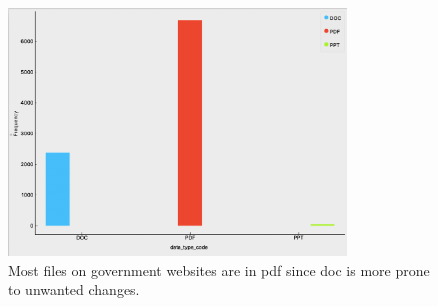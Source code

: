 \documentclass[runningheads]{llncs}
\begin{document}
\begin{figure}[H]
\centering
  \includegraphics[width=0.8\textwidth]{PDF_distribution.png}
  \caption{Most files on government websites are in pdf since doc is more prone to unwanted changes.}
\end{figure}
\end{document}
